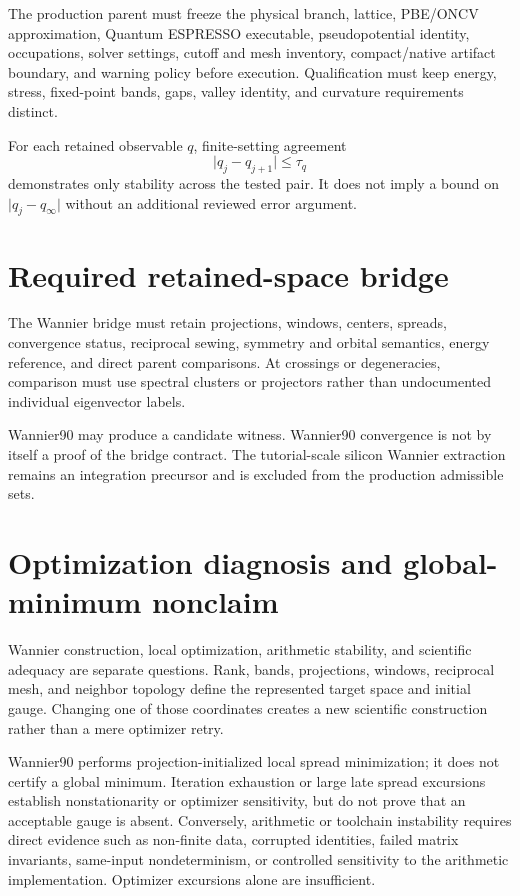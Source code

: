 \documentclass[11pt]{article}
\begin{document}
The production parent must freeze the physical branch, lattice, PBE/ONCV approximation,
Quantum ESPRESSO executable, pseudopotential identity, occupations, solver settings,
cutoff and mesh inventory, compact/native artifact boundary, and warning policy before
execution.  Qualification must keep energy, stress, fixed-point bands, gaps, valley
identity, and curvature requirements distinct.

For each retained observable $q$, finite-setting agreement
\begin{equation}
  \lvert q_j-q_{j+1}\rvert \leq \tau_q
\end{equation}
demonstrates only stability across the tested pair.  It does not imply a bound on
$\lvert q_j-q_\infty\rvert$ without an additional reviewed error argument.

\section{Required retained-space bridge}

The Wannier bridge must retain projections, windows, centers, spreads, convergence
status, reciprocal sewing, symmetry and orbital semantics, energy reference, and direct
parent comparisons.  At crossings or degeneracies, comparison must use spectral
clusters or projectors rather than undocumented individual eigenvector labels.

Wannier90 may produce a candidate witness.  Wannier90 convergence is not by itself a
proof of the bridge contract.  The tutorial-scale silicon Wannier extraction remains an
integration precursor and is excluded from the production admissible sets.

\section{Optimization diagnosis and global-minimum nonclaim}

Wannier construction, local optimization, arithmetic stability, and scientific
adequacy are separate questions.  Rank, bands, projections, windows, reciprocal mesh,
and neighbor topology define the represented target space and initial gauge.  Changing
one of those coordinates creates a new scientific construction rather than a mere
optimizer retry.

Wannier90 performs projection-initialized local spread minimization; it does not certify
a global minimum.  Iteration exhaustion or large late spread excursions establish
nonstationarity or optimizer sensitivity, but do not prove that an acceptable gauge is
absent.  Conversely, arithmetic or toolchain instability requires direct evidence such
as non-finite data, corrupted identities, failed matrix invariants, same-input
nondeterminism, or controlled sensitivity to the arithmetic implementation.  Optimizer
excursions alone are insufficient.
\end{document}
